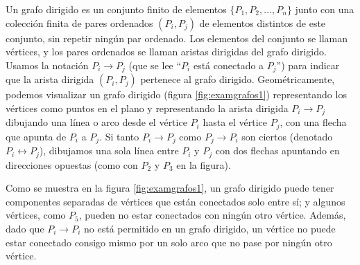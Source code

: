 Un grafo dirigido es un conjunto finito de elementos $\{P_1, P_2, \dots, P_n\}$ junto con una colección finita de pares ordenados $(P_i, P_j)$ de elementos distintos de este conjunto, sin repetir ningún par ordenado. Los elementos del conjunto se llaman vértices, y los pares ordenados se llaman aristas dirigidas del grafo dirigido. Usamos la notación $P_i \rightarrow P_j$ (que se lee “$P_i$ está conectado a $P_j$”) para indicar que la arista dirigida $(P_i, P_j)$ pertenece al grafo dirigido. Geométricamente, podemos visualizar un grafo dirigido (figura \ref{fig:examgrafos1}) representando los vértices como puntos en el plano y representando la arista dirigida $P_i \rightarrow P_j$ dibujando una línea o arco desde el vértice $P_i$ hasta el vértice $P_j$, con una flecha que apunta de $P_i$ a $P_j$. Si tanto $P_i \rightarrow P_j$ como $P_j \rightarrow P_i$ son ciertos (denotado $P_i \leftrightarrow P_j$), dibujamos una sola línea entre $P_i$ y $P_j$ con dos flechas apuntando en direcciones opuestas (como con $P_2$ y $P_3$ en la figura).

Como se muestra en la figura \ref{fig:examgrafos1}, un grafo dirigido puede tener componentes separadas de vértices que están conectados solo entre sí; y algunos vértices, como $P_5$, pueden no estar conectados con ningún otro vértice. Además, dado que $P_i \rightarrow P_i$ no está permitido en un grafo dirigido, un vértice no puede estar conectado consigo mismo por un solo arco que no pase por ningún otro vértice.

